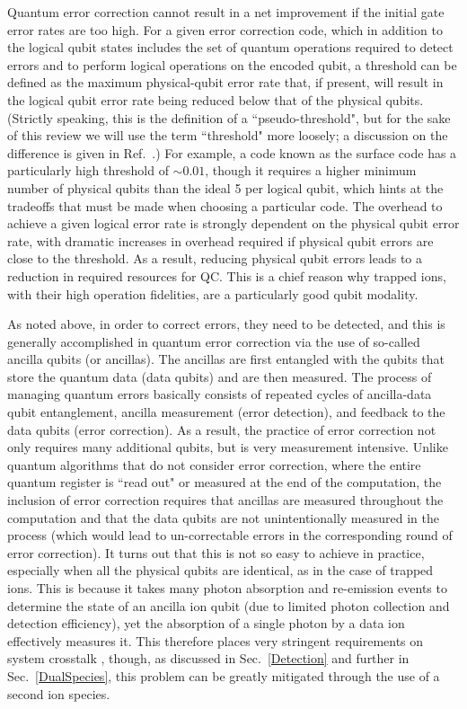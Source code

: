 \documentclass[%
reprint,
 amsmath,amssymb,
]{revtex4-1}
\begin{document}
Quantum error correction cannot result in a net improvement if the initial gate error rates are too high.  For a given error correction code, which in addition to the logical qubit states includes the set of quantum operations required to detect errors and to perform logical operations on the encoded qubit, a threshold can be defined as the maximum physical-qubit error rate that, if present, will result in the logical qubit error rate being reduced below that of the physical qubits.  (Strictly speaking, this is the definition of a ``pseudo-threshold", but for the sake of this review we will use the term ``threshold" more loosely; a discussion on the difference is given in Ref.~\cite{SvoreFT2006}.)  For example, a code known as the surface code \cite{RaussendorfSurfaceCode2007} has a particularly high threshold of ${\sim}0.01$, though it requires a higher minimum number of physical qubits than the ideal 5 per logical qubit, which hints at the tradeoffs that must be made when choosing a particular code.  The overhead to achieve a given logical error rate is strongly dependent on the physical qubit error rate, with dramatic increases in overhead required if physical qubit errors are close to the threshold.  As a result, reducing physical qubit errors leads to a reduction in required resources for QC.  This is a chief reason why trapped ions, with their high operation fidelities, are a particularly good qubit modality.

As noted above, in order to correct errors, they need to be detected, and this is generally accomplished in quantum error correction via the use of so-called ancilla qubits (or ancillas).  The ancillas are first entangled with the qubits that store the quantum data (data qubits) and are then measured.  The process of managing quantum errors basically consists of repeated cycles of ancilla-data qubit entanglement, ancilla measurement (error detection), and feedback to the data qubits (error correction).  As a result, the practice of error correction not only requires many additional qubits, but is very measurement intensive.  Unlike quantum algorithms that do not consider error correction, where the entire quantum register is ``read out" or measured at the end of the computation, the inclusion of error correction requires that ancillas are measured throughout the computation and that the data qubits are not unintentionally measured in the process (which would lead to un-correctable errors in the corresponding round of error correction).  It turns out that this is not so easy to achieve in practice, especially when all the physical qubits are identical, as in the case of trapped ions.  This is because it takes many photon absorption and re-emission events to determine the state of an ancilla ion qubit (due to limited photon collection and detection efficiency), yet the absorption of a single photon by a data ion effectively measures it.  This therefore places very stringent requirements on system crosstalk \cite{BruzewiczQLAR2017}, though, as discussed in Sec.~\ref{Detection} and further in Sec.~\ref{DualSpecies}, this problem can be greatly mitigated through the use of a second ion species.
\end{document}
